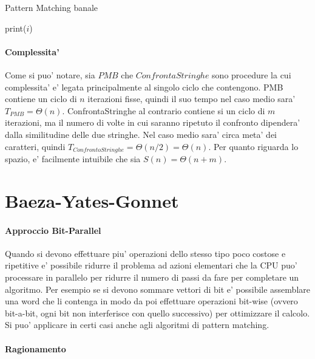 \begin{algorithm}
    \renewcommand\thealgorithm{}
    \caption{Pattern Matching banale}
    \begin{algorithmic}
                    \State print($i$)
                \EndIF
            \EndFor
            \EndFor
        \EndProcedure
    \end{algorithmic}
\end{algorithm}

\paragraph{Complessita'}

Come si puo' notare, sia $PMB$ che $ConfrontaStringhe$ sono procedure la cui complessita' e' legata principalmente al singolo ciclo che contengono.
PMB contiene un ciclo di $n$ iterazioni fisse, quindi il suo tempo nel caso medio sara' $T_{PMB} = \Theta(n)$.
ConfrontaStringhe al contrario contiene si un ciclo di $m$ iterazioni, ma il numero di volte in cui saranno ripetuto il confronto dipendera' dalla similitudine delle due stringhe.
Nel caso medio sara' circa meta' dei caratteri, quindi $T_{ConfrontoStringhe} = \Theta(n / 2) = \Theta(n)$.
Per quanto riguarda lo spazio, e' facilmente intuibile che sia $S(n) = \Theta(n + m)$.

\section{Baeza-Yates-Gonnet}

\paragraph{Approccio Bit-Parallel}

Quando si devono effettuare piu' operazioni dello stesso tipo poco costose e ripetitive e' possibile ridurre il problema ad azioni elementari che la CPU puo' processare in parallelo per ridurre il numero di passi da fare per completare un algoritmo.
Per esempio se si devono sommare vettori di bit e' possibile assemblare una word che li contenga in modo da poi effettuare operazioni bit-wise (ovvero bit-a-bit, ogni bit non interferisce con quello successivo) per ottimizzare il calcolo.
Si puo' applicare in certi casi anche agli algoritmi di pattern matching.

\paragraph{Ragionamento}

